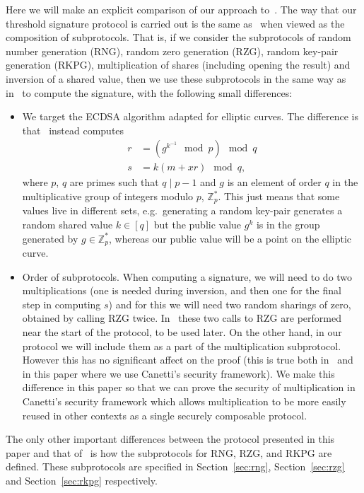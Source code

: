\documentclass{article}
\newcommand\paper{paper}
\newcommand{\seq}[1]{\left[#1\right]}
\theoremstyle{remark}
\begin{document}
Here we will make an explicit comparison of our approach to~\cite{gjkr96}. The
way that our threshold signature protocol is carried out is the same
as~\cite{gjkr96} when viewed as the composition of subprotocols. That is, if we
consider the subprotocols of random number generation (RNG), random zero
generation (RZG), random key-pair generation (RKPG), multiplication of shares
(including opening the result) and inversion of a shared value, then we use
these subprotocols in the same way as in~\cite{gjkr96} to compute the
signature, with the following small differences:
\begin{itemize}
	\item We target the ECDSA algorithm adapted for elliptic curves. The
		difference is that~\cite{gjkr96} instead computes
		\begin{align*}
			r &= \left(g^{k^{-1}} \mod p\right) \mod q\\
			s & = k(m + xr) \mod q,
		\end{align*}
		where $p$, $q$ are primes such that $q \mid p - 1$ and $g$ is an
		element of order $q$ in the multiplicative group of integers modulo
		$p$, $\mathbb{Z}_p^\ast$. This just means that some values live in
		different sets, e.g.\ generating a random key-pair generates a random
		shared value $k \in \seq{q}$ but the public value $g^k$ is in the group
		generated by $g \in \mathbb{Z}_p^\ast$, whereas our public value will
		be a point on the elliptic curve.
	\item Order of subprotocols. When computing a signature, we will need to do
		two multiplications (one is needed during inversion, and then one for
		the final step in computing $s$) and for this we will need two random
		sharings of zero, obtained by calling RZG twice.  In~\cite{gjkr96}
		these two calls to RZG are performed near the start of the protocol, to
		be used later. On the other hand, in our protocol we will include them
		as a part of the multiplication subprotocol. However this has no
		significant affect on the proof (this is true both in~\cite{gjkr96} and
		in this \paper{} where we use Canetti's security framework). We make
		this difference in this \paper{} so that we can prove the security of
		multiplication in Canetti's security framework which allows
		multiplication to be more easily reused in other contexts as a single
		securely composable protocol.
\end{itemize}

The only other important differences between the protocol presented in this
\paper{} and that of~\cite{gjkr96} is how the subprotocols for RNG, RZG, and
RKPG are defined. These subprotocols are specified in Section~\ref{sec:rng},
Section~\ref{sec:rzg} and Section~\ref{sec:rkpg} respectively.
\end{document}
